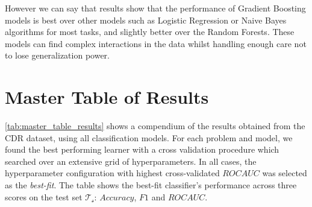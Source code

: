 However we can say that results show that the performance of Gradient Boosting models is best over other models such as Logistic Regression or Naive Bayes algorithms for most tasks, and slightly better over the Random Forests.
These models can find complex interactions in the data whilst handling enough care not to lose generalization power.




\section{Master Table of Results}\label{sec:master_table}

\cref{tab:master_table_results} shows a compendium of the results obtained from the CDR dataset, using all classification models.
For each problem and model, we found the best performing learner with a cross validation procedure which searched over an extensive grid of hyperparameters.
In all cases, the hyperparameter configuration with highest cross-validated $ROC AUC$ was selected as the \textit{best-fit}.
The table shows the best-fit classifier's performance across three scores on the test set $\mathcal{T_s}$: $Accuracy$, $F1$ and $ROC AUC$.


